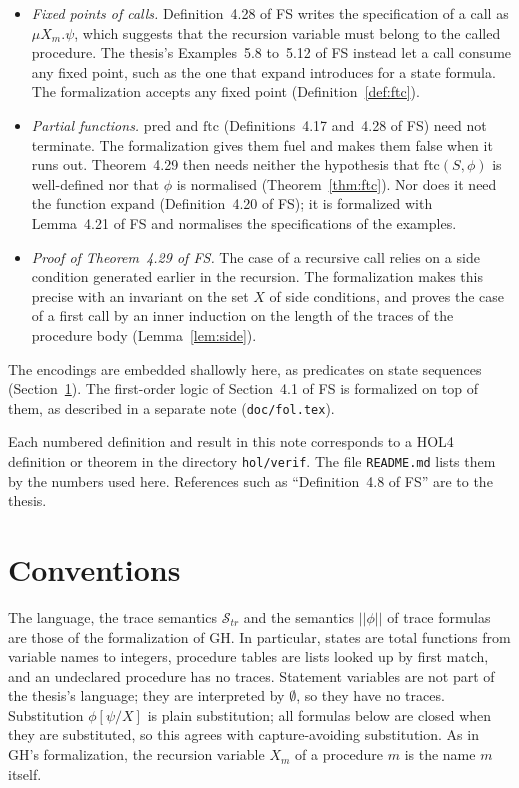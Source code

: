 \documentclass[11pt]{article}
\newcommand{\fsem}[1]{|\!|#1|\!|}
\newcommand{\Str}{{\mathcal{S}_{\mathit{tr}}}}
\newcommand{\ftc}{\mathrm{ftc}}
\newcommand{\pred}{\mathrm{pred}}
\newcommand{\Th}[1]{#1 of FS}
\theoremstyle{plain}
\theoremstyle{definition}
\theoremstyle{remark}
\begin{document}
\begin{itemize}
\item \emph{Fixed points of calls.} \Th{Definition~4.28} writes the
  specification of a call as $\mu X_m.\psi$, which suggests that the
  recursion variable must belong to the called procedure. The thesis's
  \Th{Examples~5.8 to~5.12} instead let a call consume any fixed point,
  such as the one that $\mathrm{expand}$ introduces for a state formula.
  The formalization accepts any fixed point (Definition~\ref{def:ftc}).
\item \emph{Partial functions.} $\pred$ and $\ftc$
  (\Th{Definitions~4.17 and~4.28}) need not terminate. The formalization
  gives them fuel and makes them false when it runs out. Theorem~4.29 then
  needs neither the hypothesis that $\ftc(S, \phi)$ is well-defined nor that
  $\phi$ is normalised (Theorem~\ref{thm:ftc}). Nor does it need the
  function $\mathrm{expand}$ (\Th{Definition~4.20}); it is formalized with
  \Th{Lemma~4.21} and normalises the specifications of the examples.
\item \emph{Proof of \Th{Theorem~4.29}.} The case of a recursive call
  relies on a side condition generated earlier in the recursion. The
  formalization makes this precise with an invariant on the set $X$ of
  side conditions, and proves the case of a first call by an inner
  induction on the length of the traces of the procedure body
  (Lemma~\ref{lem:side}).
\end{itemize}
The encodings are embedded shallowly here, as predicates on state
sequences (Section~\ref{sec:conv}). The first-order logic of
\Th{Section~4.1} is formalized on top of them, as described in a separate
note (\texttt{doc/fol.tex}).

Each numbered definition and result in this note corresponds to a HOL4
definition or theorem in the directory \texttt{hol/verif}. The file
\texttt{README.md} lists them by the numbers used here. References such as
``\Th{Definition~4.8}'' are to the thesis.

\section{Conventions}\label{sec:conv}

The language, the trace semantics $\Str$ and the semantics $\fsem{\phi}$ of
trace formulas are those of the formalization of GH. In particular, states
are total functions from variable names to integers, procedure tables are
lists looked up by first match, and an undeclared procedure has no traces.
Statement variables are not part of the thesis's language; they are
interpreted by $\emptyset$, so they have no traces. Substitution
$\phi[\psi/X]$ is plain substitution; all formulas below are closed when
they are substituted, so this agrees with capture-avoiding substitution.
As in GH's formalization, the recursion variable $X_m$ of a procedure $m$
is the name $m$ itself.
\end{document}
